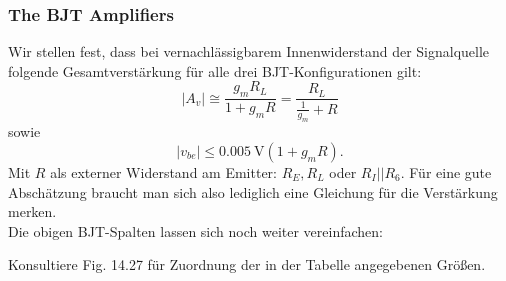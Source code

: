 \documentclass[11pt,a4paper,titlepage]{article}
\begin{document}
\subsubsection{The BJT Amplifiers}
Wir stellen fest, dass bei vernachlässigbarem Innenwiderstand der Signalquelle folgende Gesamtverstärkung für alle drei BJT-Konfigurationen gilt:
\[ |A_v| \cong \frac{g_mR_L}{1+g_mR} = \frac{R_L}{\frac{1}{g_m}+R} \]
sowie
\[ |v_{be}| \leq \SI{0.005}{\volt}(1+g_mR). \]
Mit $R$ als externer Widerstand am Emitter: $R_E, R_L$ oder $R_I||R_6$. Für eine gute Abschätzung braucht man sich also lediglich eine Gleichung für die Verstärkung merken.\\
Die obigen BJT-Spalten lassen sich noch weiter vereinfachen:
\begin{table}[h!]
	\caption{Simplified Characteristics of Single BJT Amplifiers}
	\centering
	\label{tab:BJT_simplified} 
\end{table}
Konsultiere Fig. 14.27 für Zuordnung der in der Tabelle angegebenen Größen.
\end{document}
